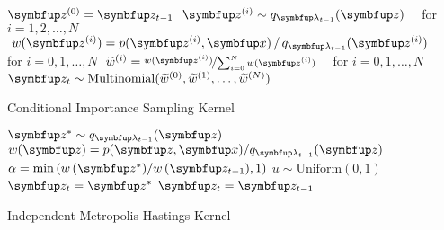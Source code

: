 \begin{center}
\begin{minipage}[c]{0.7\textwidth}%
  \begin{algorithm2e}[H]
    \DontPrintSemicolon
    \SetAlgoLined
    \(\vz^{(0)} = \vz_{t-1}\) \;
    \(\;\vz^{(i)} \sim q_{\vlambda_{t-1}}(\vz)\quad\) for \(i = 1, 2,\ldots, N\) \;
    \(\;w(\vz^{(i)}) = p(\vz^{(i)},\vx) \,/\, q_{\vlambda_{t-1}}(\vz^{(i)})\quad\) for \(i = 0, 1,\ldots, N\)\;
    \(\;\widetilde{w}^{(i)} = \nicefrac{w(\vz^{(i)})}{ \sum^{N}_{i=0} w(\vz^{(i)}) }\quad\) for \(i = 0, 1,\ldots, N\)\;
    \(\vz_{t} \sim \mathrm{Multinomial}(\widetilde{w}^{(0)}, \widetilde{w}^{(1)}, \ldots, \widetilde{w}^{(N)}) \)\;
    \caption{Conditional Importance Sampling Kernel}
  \end{algorithm2e}
\end{minipage}

\begin{minipage}[c]{0.7\textwidth}%
  \begin{algorithm2e}[H]
    \DontPrintSemicolon
    \SetAlgoLined
    \(\vz^* \sim q_{\vlambda_{t-1}}(\vz)\)\;
    \(w(\vz) = p(\vz,\vx)/q_{\vlambda_{t-1}}(\vz) \)\;
    \(\alpha = \min\left( w\,(\vz^*)/w\,(\vz_{t-1}), 1\right)\)\;
    \(u \sim \mathrm{Uniform}(0, 1) \)\;
        {
          \(\vz_t = \vz^*\)
        }
        {
          \(\vz_t = \vz_{t-1}\)
        }
        \caption{Independent Metropolis-Hastings Kernel}
  \end{algorithm2e}
\end{minipage}

\end{center}

